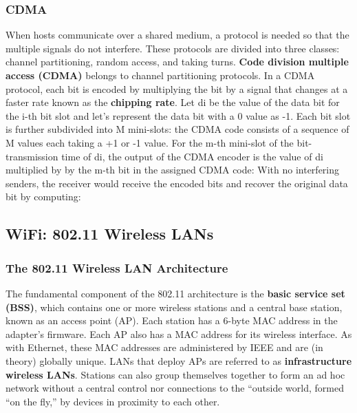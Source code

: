 \documentclass{article}
\begin{document}
\subsubsection{CDMA}
When hosts communicate over a shared medium, a protocol is needed so that the multiple signals do not interfere.
These protocols are divided into three classes: channel partitioning, random access, and taking turns.
\textbf{Code division multiple access (CDMA)} belongs to channel partitioning protocols.
In a CDMA protocol, each bit is encoded by multiplying the bit by a signal that changes at a faster rate known as the \textbf{chipping rate}.
Let di be the value of the data bit for the i-th bit slot and let's represent the data bit with a 0 value as -1.
Each bit slot is further subdivided into M mini-slots: the CDMA code consists of a sequence of M values each taking a +1 or -1 value.
For the m-th mini-slot of the bit-transmission time of di, the
output of the CDMA encoder is the value of di multiplied by by the m-th bit in the assigned CDMA code: 
With no interfering senders, the receiver would receive the encoded bits and recover the original data bit by computing: 

\subsection{WiFi: 802.11 Wireless LANs}
\subsubsection{The 802.11 Wireless LAN Architecture}
The fundamental component of the 802.11 architecture is the \textbf{basic service set (BSS)}, which contains one or more wireless stations and a central base station, known as an access point (AP).
Each station has a 6-byte MAC address in the adapter's firmware.
Each AP also has a MAC address for its wireless interface.
As with Ethernet, these MAC addresses are administered by IEEE and are (in theory) globally unique. 
LANs that deploy APs are referred to as \textbf{infrastructure wireless LANs}.
Stations can also group themselves together to form an ad hoc network without a central control nor connections to the “outside world, formed “on the fly,” by devices in proximity to each other.
\end{document}
